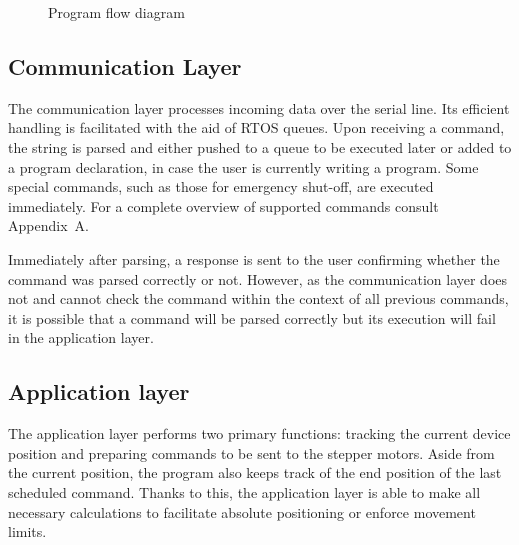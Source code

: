 \begin{figure}[h!]

  \caption[Program flow diagram]{Program flow diagram}
  \label{fig:code_diag}
\end{figure}

\subsection{Communication Layer}

The communication layer processes incoming data over the serial line.
Its efficient handling is facilitated with the aid of RTOS queues.
Upon receiving a command, the string is parsed and either pushed to a queue to be executed later or added to a program declaration, in case the user is currently writing a program.
Some special commands, such as those for emergency shut-off, are executed immediately.
For a complete overview of supported commands consult Appendix~A.

Immediately after parsing, a response is sent to the user confirming whether the command was parsed correctly or not.
However, as the communication layer does not and cannot check the command within the context of all previous commands, it is possible that a command will be parsed correctly but its execution will fail in the application layer.

\subsection{Application layer}

The application layer performs two primary functions: tracking the current device position and preparing commands to be sent to the stepper motors.
Aside from the current position, the program also keeps track of the end position of the last scheduled command.
Thanks to this, the application layer is able to make all necessary calculations to facilitate absolute positioning or enforce movement limits.

